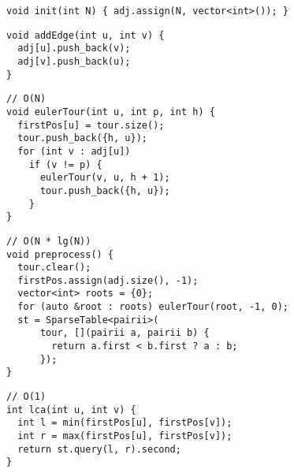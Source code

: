 \documentclass[twoside]{article}
\newcommand{\fileTitleStyle}{\large\underline}
\begin{document}
\begin{multicols*}{2}
\begin{verbatim}
void init(int N) { adj.assign(N, vector<int>()); }
\end{verbatim}
\vspace{-12pt}
\begin{verbatim}
void addEdge(int u, int v) {
  adj[u].push_back(v);
  adj[v].push_back(u);
}
\end{verbatim}
\vspace{-12pt}
\begin{verbatim}
// O(N)
void eulerTour(int u, int p, int h) {
  firstPos[u] = tour.size();
  tour.push_back({h, u});
  for (int v : adj[u])
    if (v != p) {
      eulerTour(v, u, h + 1);
      tour.push_back({h, u});
    }
}
\end{verbatim}
\vspace{-12pt}
\begin{verbatim}
// O(N * lg(N))
void preprocess() {
  tour.clear();
  firstPos.assign(adj.size(), -1);
  vector<int> roots = {0};
  for (auto &root : roots) eulerTour(root, -1, 0);
  st = SparseTable<pairii>(
      tour, [](pairii a, pairii b) {
        return a.first < b.first ? a : b;
      });
}
\end{verbatim}
\vspace{-12pt}
\begin{verbatim}
// O(1)
int lca(int u, int v) {
  int l = min(firstPos[u], firstPos[v]);
  int r = max(firstPos[u], firstPos[v]);
  return st.query(l, r).second;
}
\end{verbatim}

\subsectionfont{\centering\bfseries\LARGE}
\subsectionfont{\fileTitleStyle}

\end{multicols*}
\end{document}
